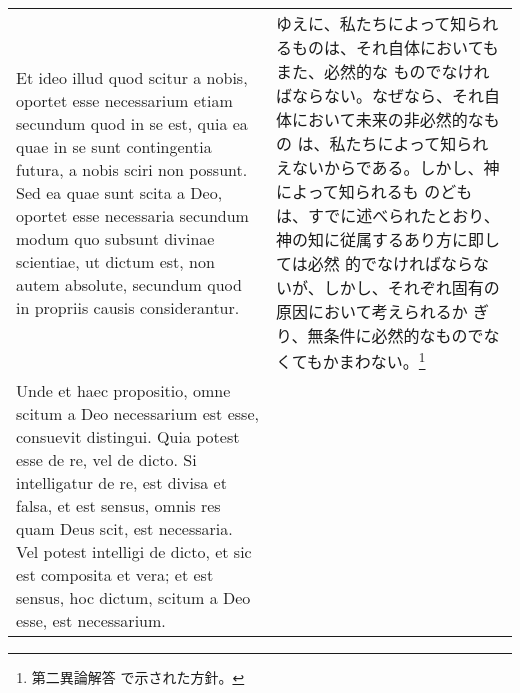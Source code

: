 \documentclass[10pt]{jsarticle} %
\begin{document}
\begin{longtable}{p{21em}p{21em}}
\\

Et ideo illud quod scitur a nobis, oportet esse necessarium etiam
secundum quod in se est, quia ea quae in se sunt contingentia futura,
a nobis sciri non possunt. Sed ea quae sunt scita a Deo, oportet esse
necessaria secundum modum quo subsunt divinae scientiae, ut dictum
est, non autem absolute, secundum quod in propriis causis
considerantur.


&

ゆえに、私たちによって知られるものは、それ自体においてもまた、必然的な
ものでなければならない。なぜなら、それ自体において未来の非必然的なもの
は、私たちによって知られえないからである。しかし、神によって知られるも
のどもは、すでに述べられたとおり、神の知に従属するあり方に即しては必然
的でなければならないが、しかし、それぞれ固有の原因において考えられるか
ぎり、無条件に必然的なものでなくてもかまわない。\footnote{第二異論解答
で示された方針。}

\\

Unde et haec propositio, omne scitum a Deo
necessarium est esse, consuevit distingui. Quia potest esse de re, vel
de dicto. Si intelligatur de re, est divisa et falsa, et est sensus,
omnis res quam Deus scit, est necessaria. Vel potest intelligi de dicto,
et sic est composita et vera; et est sensus, hoc dictum, scitum a Deo
esse, est necessarium. 


&


\end{longtable}
\end{document}
